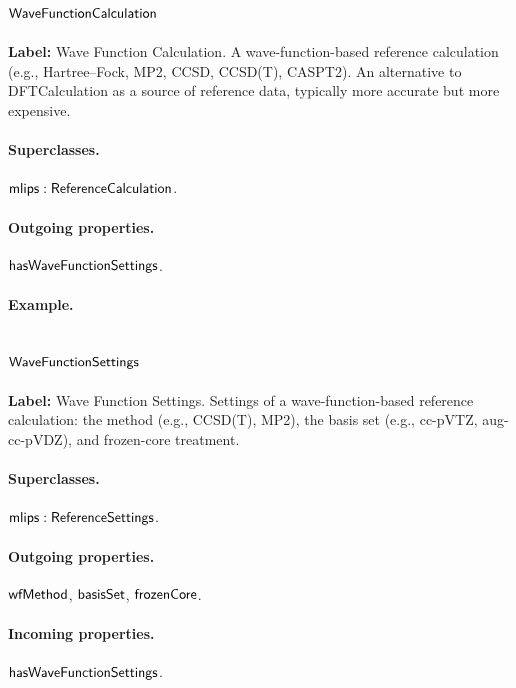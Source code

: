 \subsection{$\mathsf{WaveFunctionCalculation}$}
\label{sec:term-WaveFunctionCalculation}

\textbf{Label:} Wave Function Calculation.
A wave-function-based reference calculation (e.g., Hartree--Fock, MP2, CCSD, CCSD(T), CASPT2). An alternative to DFTCalculation as a source of reference data, typically more accurate but more expensive.

\paragraph{Superclasses.} $\mathsf{mlips:ReferenceCalculation}$.

\paragraph{Outgoing properties.} $\mathsf{hasWaveFunctionSettings}$.

\paragraph{Example.}

\subsection{$\mathsf{WaveFunctionSettings}$}
\label{sec:term-WaveFunctionSettings}

\textbf{Label:} Wave Function Settings.
Settings of a wave-function-based reference calculation: the method (e.g., CCSD(T), MP2), the basis set (e.g., cc-pVTZ, aug-cc-pVDZ), and frozen-core treatment.

\paragraph{Superclasses.} $\mathsf{mlips:ReferenceSettings}$.

\paragraph{Outgoing properties.} $\mathsf{wfMethod}$, $\mathsf{basisSet}$, $\mathsf{frozenCore}$.

\paragraph{Incoming properties.} $\mathsf{hasWaveFunctionSettings}$.

